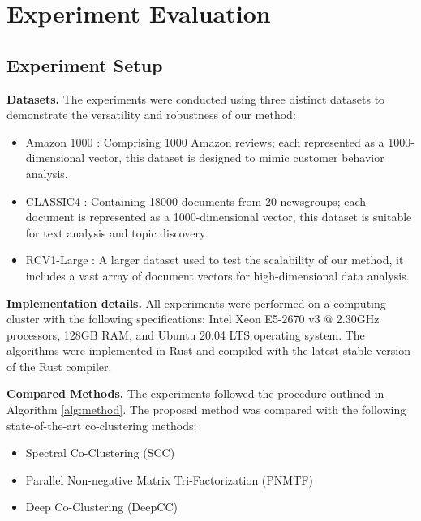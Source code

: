 
\section{Experiment Evaluation}
\label{sec:experiment}
\subsection{Experiment Setup}

\textbf{Datasets.}
The experiments were conducted using three distinct datasets to demonstrate the versatility and robustness of our method:

\begin{itemize}
    \item Amazon 1000 \cite{ni2019justifying}: Comprising 1000 Amazon reviews; each represented as a 1000-dimensional vector, this dataset is designed to mimic customer behavior analysis.
    \item CLASSIC4 \cite{reddy2021weclustering}: Containing 18000 documents from 20 newsgroups; each document is represented as a 1000-dimensional vector, this dataset is suitable for text analysis and topic discovery.
    \item RCV1-Large \cite{lewis2004rcv1}: A larger dataset used to test the scalability of our method, it includes a vast array of document vectors for high-dimensional data analysis.
\end{itemize}

\textbf{Implementation details.}
All experiments were performed on a computing cluster with the following specifications: Intel Xeon E5-2670 v3 @ 2.30GHz processors, 128GB RAM, and Ubuntu 20.04 LTS operating system. The algorithms were implemented in Rust and compiled with the latest stable version of the Rust compiler.

\textbf{Compared Methods.}
The experiments followed the procedure outlined in Algorithm \ref{alg:method}. The proposed method was compared with the following state-of-the-art co-clustering methods:

\begin{itemize}
    \item Spectral Co-Clustering (SCC) \cite{dhillon2001CoclusteringDocumentsWords}
    \item Parallel Non-negative Matrix Tri-Factorization (PNMTF)\cite{chen2023ParallelNonNegativeMatrix}
    \item Deep Co-Clustering (DeepCC) \cite{dongkuanxu2019DeepCoClustering}
\end{itemize}

